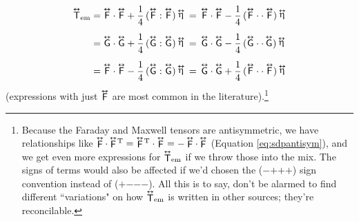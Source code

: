 \documentclass[12pt]{article}
\newcommand{\tightoverset}[2]{%
  \mathop{#2}\limits^{\vbox to -.5ex{\kern-0.75ex\hbox{$#1$}\vss}}}
\newcommand{\inlinedy}[1]{\tightoverset{\text{\tiny$\bm\leftrightarrow$}}{#1}}
\newcommand{\fnoverset}[2]{%
  \mathop{#2}\limits^{\vbox to -.5ex{\kern-0.85ex\hbox{$#1$}\vss}}}
\newcommand{\footnotedy}[1]{\fnoverset{\text{\tiny$\bm\leftrightarrow$}}{#1}}
\newcommand{\capdy}[1]{ \overset{ \text{\tiny$\bm\leftrightarrow$} }{\vphantom{\text{\small{A}}}\smash{#1}} }
\begin{document}
\begin{equation}\label{eq:eseta}
\begin{aligned}
\capdy{\mathsf{T}}_{\textrm{em}} &= \capdy{\mathsf{F}} \cdot \capdy{\mathsf{F}} +  \dfrac{1}{4} \, ( \capdy{\mathsf{F}} : \capdy{\mathsf{F}} ) \inlinedy{\upeta} \, = \, \capdy{\mathsf{F}} \cdot \capdy{\mathsf{F}} -  \dfrac{1}{4} \, ( \capdy{\mathsf{F}} \cdot \cdot \, \mkern1mu \capdy{\mathsf{F}} ) \inlinedy{\upeta} \\[5pt]
&= \capdy{\mathsf{G}} \cdot \capdy{\mathsf{G}} +  \dfrac{1}{4} \, ( \capdy{\mathsf{G}} : \capdy{\mathsf{G}} ) \inlinedy{\upeta}  \, = \,  \capdy{\mathsf{G}} \cdot \capdy{\mathsf{G}} -  \dfrac{1}{4} \, ( \capdy{\mathsf{G}} \cdot \cdot \, \capdy{\mathsf{G}} ) \inlinedy{\upeta}  \\[5pt]
&= \capdy{\mathsf{F}} \cdot \capdy{\mathsf{F}} -  \dfrac{1}{4} \, ( \capdy{\mathsf{G}} : \capdy{\mathsf{G}} ) \inlinedy{\upeta} \, = \, \capdy{\mathsf{G}} \cdot \capdy{\mathsf{G}} +  \dfrac{1}{4} \, ( \capdy{\mathsf{F}} \cdot \cdot \, \mkern1mu \capdy{\mathsf{F}} ) \inlinedy{\upeta}
\end{aligned}
\end{equation}
(expressions with just $\inlinedy{\mathsf{F}}$ are most common in the literature).\footnote{Because the Faraday and Maxwell tensors are antisymmetric, we have relationships like $\footnotedy{\mathsf{F}} \cdot \footnotedy{\mathsf{F}} \mkern-2mu^\mathrm{T} = \footnotedy{\mathsf{F}} \mkern-2mu^\mathrm{T} \cdot \footnotedy{\mathsf{F}} = - \footnotedy{\mathsf{F}} \cdot \footnotedy{\mathsf{F}}$ (Equation \ref{eq:sdpantisym}), and we get even more expressions for ${\footnotedy{\mathsf{T}}}_{\textrm{em}}$ if we throw those into the mix. The signs of terms would also be affected if we'd chosen the ($-$$+$$+$$+$) sign convention instead of ($+$$-$$-$$-$). All this is to say, don't be alarmed to find different ``variations" on how ${\footnotedy{\mathsf{T}}}_{\textrm{em}}$ is written in other sources; they're reconcilable.}
\end{document}
